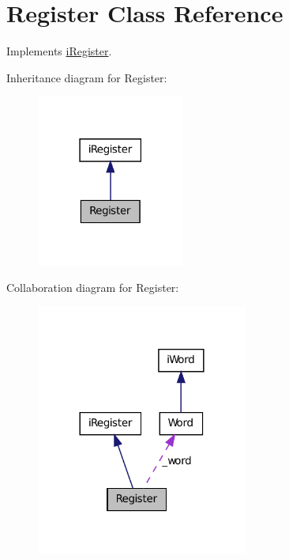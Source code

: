 \hypertarget{classRegister}{
\section{Register Class Reference}
\label{classRegister}
}


Implements \hyperlink{classiRegister}{iRegister}.  




Inheritance diagram for Register:
\nopagebreak
\begin{figure}[H]
\begin{center}
\leavevmode
\includegraphics[width=138pt]{classRegister__inherit__graph}
\end{center}
\end{figure}


Collaboration diagram for Register:
\nopagebreak
\begin{figure}[H]
\begin{center}
\leavevmode
\includegraphics[width=197pt]{classRegister__coll__graph}
\end{center}
\end{figure}

